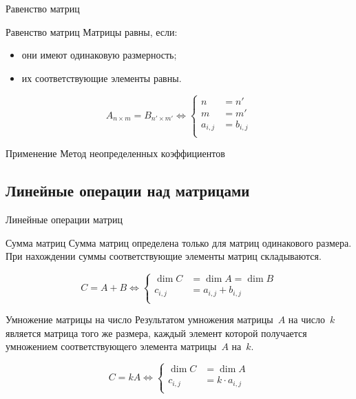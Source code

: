 \documentclass[unicode,11pt,notheorems]{beamer}
\begin{document}
\begin{frame}{Равенство матриц}
	\begin{block}{Равенство матриц}
		Матрицы \alert{равны}, если:
		\begin{itemize}
		\item 
			они имеют одинаковую размерность;
		\item
		 	их соответствующие элементы равны.
		\end{itemize} 
	\end{block}
	$$
	A_{n\times m} = B_{n'\times m'} \Longleftrightarrow 
	\left\lbrace
	\begin{aligned}
		n &= n'\\
		m &= m'\\
		a_{i,j} &=b_{i,j}\\
	\end{aligned}
	\right.
	$$

	\begin{exampleblock}{Применение}
		Метод неопределенных коэффициентов
	\end{exampleblock}

\end{frame}
\subsection{Линейные операции над матрицами}


\begin{frame}{Линейные операции матриц}
	\begin{block}{Сумма матриц}
		Сумма матриц определена только для матриц одинакового размера.
		При нахождении суммы соответствующие элементы матриц складываются. 
	\end{block}
	\vspace{-3mm}
	$$
	C = A + B \Longleftrightarrow 
	\left\lbrace\begin{aligned}
		\dim C &= \dim A =\dim B\\
		c_{i,j} &= a_{i,j} + b_{i,j}\\
	\end{aligned}
	\right.
	$$
	\begin{block}{Умножение матрицы на число}
		Результатом умножения матрицы~$A$ на число~$k$ является матрица того же размера, каждый элемент которой получается умножением соответствующего элемента матрицы~$A$  на~$k$.
	\end{block}	
	\vspace{-3mm}
		$$
		C = kA \Longleftrightarrow 
		\left\lbrace\begin{aligned}
			\dim C &= \dim A\\
			c_{i,j} &= k\cdot a_{i,j}\\
		\end{aligned}
		\right.
		$$
\end{frame}
\end{document}
